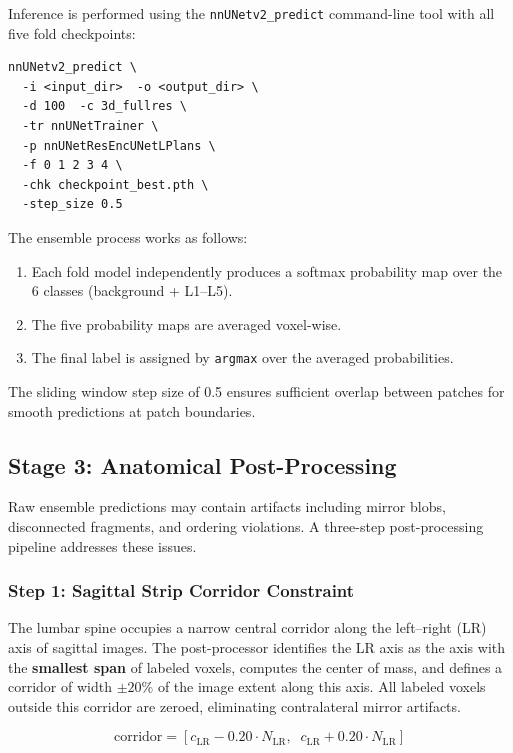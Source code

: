 \documentclass[12pt, a4paper]{article}
\begin{document}
Inference is performed using the \texttt{nnUNetv2\_predict} command-line tool with all five fold checkpoints:

\begin{verbatim}
nnUNetv2_predict \
  -i <input_dir>  -o <output_dir> \
  -d 100  -c 3d_fullres \
  -tr nnUNetTrainer \
  -p nnUNetResEncUNetLPlans \
  -f 0 1 2 3 4 \
  -chk checkpoint_best.pth \
  -step_size 0.5
\end{verbatim}

The ensemble process works as follows:
\begin{enumerate}[noitemsep]
    \item Each fold model independently produces a softmax probability map over the 6 classes (background + L1--L5).
    \item The five probability maps are averaged voxel-wise.
    \item The final label is assigned by \texttt{argmax} over the averaged probabilities.
\end{enumerate}

The sliding window step size of 0.5 ensures sufficient overlap between patches for smooth predictions at patch boundaries.

\subsection{Stage 3: Anatomical Post-Processing}
\label{sec:postprocessing}

Raw ensemble predictions may contain artifacts including mirror blobs, disconnected fragments, and ordering violations. A three-step post-processing pipeline addresses these issues.

\subsubsection{Step 1: Sagittal Strip Corridor Constraint}

The lumbar spine occupies a narrow central corridor along the left--right (LR) axis of sagittal images. The post-processor identifies the LR axis as the axis with the \textbf{smallest span} of labeled voxels, computes the center of mass, and defines a corridor of width $\pm 20\%$ of the image extent along this axis. All labeled voxels outside this corridor are zeroed, eliminating contralateral mirror artifacts.

\begin{equation}
    \text{corridor} = \left[ c_{\text{LR}} - 0.20 \cdot N_{\text{LR}}, \;\; c_{\text{LR}} + 0.20 \cdot N_{\text{LR}} \right]
\end{equation}
\end{document}
